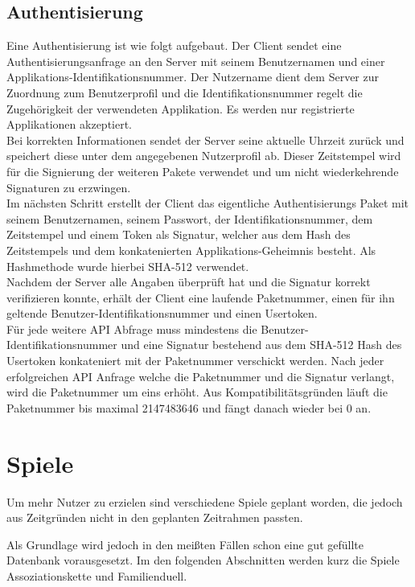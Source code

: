 \subsection{Authentisierung}
Eine Authentisierung ist wie folgt aufgebaut.
Der Client sendet eine Authentisierungsanfrage an den Server mit seinem
Benutzernamen und einer Applikations-Identifikationsnummer. Der Nutzername
dient dem Server zur Zuordnung zum Benutzerprofil und die Identifikationsnummer
regelt die Zugehörigkeit der verwendeten Applikation. Es werden nur registrierte
Applikationen akzeptiert.\\
Bei korrekten Informationen sendet der Server seine aktuelle Uhrzeit zurück
und speichert diese unter dem angegebenen Nutzerprofil ab. Dieser Zeitstempel
wird für die Signierung der weiteren Pakete verwendet und um nicht wiederkehrende
Signaturen zu erzwingen.\\
Im nächsten Schritt erstellt der Client das eigentliche Authentisierungs Paket mit
seinem Benutzernamen, seinem Passwort, der Identifikationsnummer, dem Zeitstempel
und einem Token als Signatur, welcher aus dem Hash des Zeitstempels und dem
konkatenierten Applikations-Geheimnis besteht. Als Hashmethode wurde hierbei
SHA-512 verwendet.\\
Nachdem der Server alle Angaben überprüft hat und die Signatur korrekt
verifizieren konnte, erhält der Client eine laufende Paketnummer, einen für ihn
geltende Benutzer-Identifikationsnummer und einen Usertoken.\\
Für jede weitere API Abfrage muss mindestens die Benutzer-Identifikationsnummer
und eine Signatur bestehend aus dem SHA-512 Hash des Usertoken konkateniert mit
der Paketnummer verschickt werden. Nach jeder erfolgreichen API Anfrage welche
die Paketnummer und die Signatur verlangt, wird die Paketnummer um eins erhöht.
Aus Kompatibilitätsgründen läuft die Paketnummer bis maximal 2147483646 und
fängt danach wieder bei 0 an.


\section{Spiele}\label{sec:spiele}
Um mehr Nutzer zu erzielen sind verschiedene Spiele geplant worden, die jedoch
aus Zeitgründen nicht in den geplanten Zeitrahmen passten.

Als Grundlage wird jedoch in den meißten Fällen schon eine gut gefüllte Datenbank
vorausgesetzt. Im den folgenden Abschnitten werden kurz die Spiele Assoziationskette und Familienduell.

